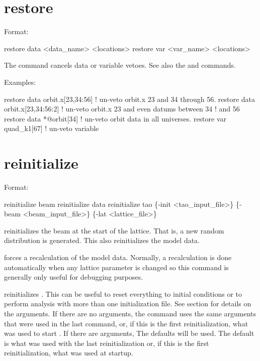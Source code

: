 \section{restore}
\label{s:restore}

Format:
\begin{example}
  restore data  <data_name> <locations>
  restore var <var_name> <locations>
\end{example}

\vskip 0.2in 
The  command cancels data or variable
vetoes. See also the 
and  commands.

Examples:
\begin{example}
  restore data orbit.x[23,34:56]   ! un-veto orbit.x 23 and 34 through 56.
  restore data orbit.x[23,34:56:2] ! un-veto orbit.x 23 and even datums between 34 
                                   !                                          and 56
  restore data *@orbit[34]         ! un-veto orbit data in all universes.
  restore var quad_k1[67]          ! un-veto variable
\end{example}

\section{reinitialize}
\label{s:reinit}

Format:
\begin{example}
  reinitialize beam
  reinitialize data
  reinitialize tao \{-init <tao_input_file>\} 
                       \{-beam <beam_input_file>\} \{-lat <lattice_file>\}
\end{example}

\vskip 0.2in 
 reinitializes the beam at the start of the
lattice.  That is, a new random distribution is generated. This also
reinitializes the model data.

 forces a recalculation of the model data.
Normally, a recalculation is done automatically when any lattice
parameter is changed so this command is generally only useful for
debugging purposes.

 reinitializes \tao. This can be useful to reset
everything to initial conditions or to perform analysis with more than
one initialization file.  See section  for
details on the arguments.  If there are no arguments, the
 command uses the same arguments that were used in
the last  command, or, if this is the first
reinitialization, what was used to start \tao. If there are arguments,
The defaults will be used.  The default  is what was
used with the last reinitialization or, if this is the first
reinitialization, what was used at startup.

